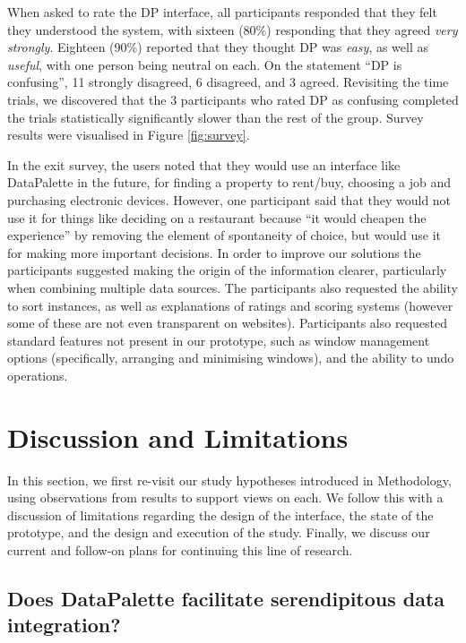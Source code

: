 \documentclass{sigchi}
\begin{document}
When asked to rate the DP interface, all participants responded that they felt they understood the system, with sixteen (80\%) responding that they agreed \emph{very strongly}.  Eighteen (90\%) reported that they thought  DP was \emph{easy}, as well as \emph{useful}, with one person being neutral on each.  On the statement ``DP is confusing'',  11 strongly disagreed, 6 disagreed, and 3 agreed.  Revisiting the time trials, we discovered that the 3 participants who rated DP as confusing completed the trials statistically significantly slower than the rest of the group. Survey results were visualised in Figure \ref{fig:survey}.


In the exit survey, the users noted that they would use an interface like DataPalette in the future, for finding a property to rent/buy, choosing a job and purchasing electronic devices.  However, one participant said that they would not use it for things like deciding on a restaurant because ``it would cheapen the experience'' by removing the element of spontaneity of choice, but would use it for making more important decisions.  In order to improve our solutions the participants suggested making the origin of the information clearer, particularly when combining multiple data sources. The participants also requested the ability to sort instances, as well as explanations of ratings and scoring systems (however some of these are not even transparent on websites). Participants also requested standard features not present in our prototype, such as window management options (specifically, arranging and minimising windows), and the ability to undo operations.

\section{Discussion and Limitations}

In this section, we first re-visit our study hypotheses introduced in Methodology, using observations from results to support views on each.  We follow this with a discussion of limitations regarding the design of the interface, the state of the prototype, and the design and execution of the study.  Finally, we discuss our current and follow-on plans for continuing this line of research.

\subsection{Does DataPalette facilitate serendipitous data integration?}
\end{document}
